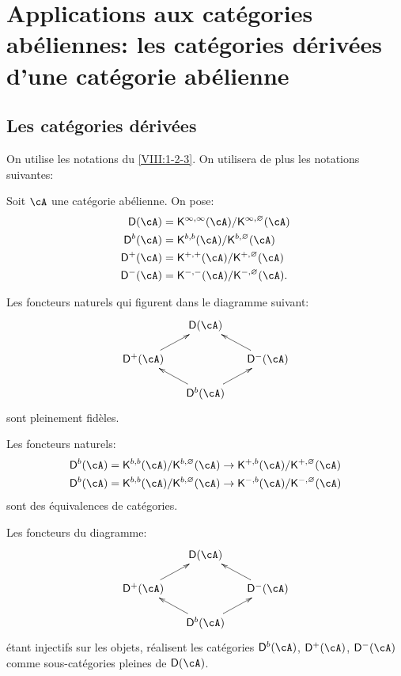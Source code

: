 \section{Applications aux cat\'egories abéliennes: les cat\'egories d\'eriv\'ees d'une cat\'egorie ab\'elienne}\label{VIII:3}





\subsection{Les cat\'egories d\'eriv\'ees}\label{VIII:3-1}

On utilise les notations du \ref{VIII:1-2-3}. On utilisera de plus les 
notations suivantes: 

\begin{definition}\label{VIII:3-1-1}
Soit $\cA$ une cat\'egorie ab\'elienne. On pose: 
\begin{align*}
  \D(\cA) &= \eK^{\infty,\infty}(\cA)/\eK^{\infty,\varnothing}(\cA) \\
  \D^b(\cA) &= \eK^{b,b}(\cA)/\eK^{b,\varnothing}(\cA) \\
  \D^+(\cA) &= \eK^{+,+}(\cA) / \eK^{+,\varnothing}(\cA) \\
  \D^-(\cA) &= \eK^{-,-}(\cA) / \eK^{-,\varnothing}(\cA) \text{.}
\end{align*}
\end{definition}





\begin{proposition}\label{VIII:3-1-2}
Les foncteurs naturels qui figurent dans le diagramme suivant: 
\[\xymatrix@=0.5cm{
  & \D(\cA) \\
  \D^+(\cA) \ar[ur] 
    & & \D^-(\cA) \ar[ul] \\
  & \D^b(\cA) \ar[ul] \ar[ur] 
}\]
sont pleinement fid\`eles. 

Les foncteurs naturels: 
\begin{align*}
  \D^b(\cA) &= \eK^{b,b}(\cA)/\eK^{b,\varnothing}(\cA) \to \eK^{+,b}(\cA)/\eK^{+,\varnothing}(\cA) \\
  \D^b(\cA) &= \eK^{b,b}(\cA)/\eK^{b,\varnothing}(\cA) \to \eK^{-,b}(\cA) / \eK^{-,\varnothing}(\cA) 
\end{align*}
sont des \'equivalences de cat\'egories. 

Les foncteurs du diagramme: 
\[\xymatrix@=0.5cm{
  & \D(\cA) \\
  \D^+(\cA) \ar[ur] 
    & & \D^-(\cA) \ar[ul] \\
  & \D^b(\cA) \ar[ul] \ar[ur]
}\]
\'etant injectifs sur les objets, r\'ealisent les cat\'egories $\D^b(\cA)$, 
$\D^+(\cA)$, $\D^-(\cA)$ comme sous-cat\'egories pleines de $\D(\cA)$. 
\end{proposition}

